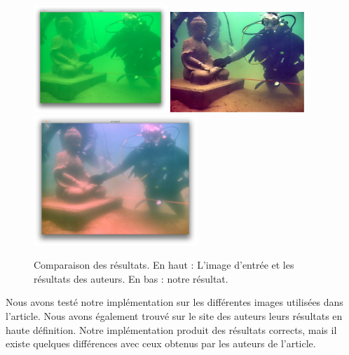 \documentclass[twoside]{article}
\begin{document}
\begin{figure}[H]
  \centering
  \includegraphics[width=0.45\textwidth]{Support/input.png}
  \includegraphics[width=0.45\textwidth]{Support/theirs.png}
  \includegraphics[width=0.55\textwidth]{Support/ours.png}
  \caption{Comparaison des résultats. En haut : L'image d'entrée et les résultats des auteurs. En bas : notre résultat.}
\end{figure}

Nous avons testé notre implémentation sur les différentes images utilisées dans l'article. Nous avons également trouvé sur le site des auteurs leurs résultats en haute définition. Notre implémentation produit des résultats corrects, mais il existe quelques différences avec ceux obtenus par les auteurs de l'article.
\end{document}
